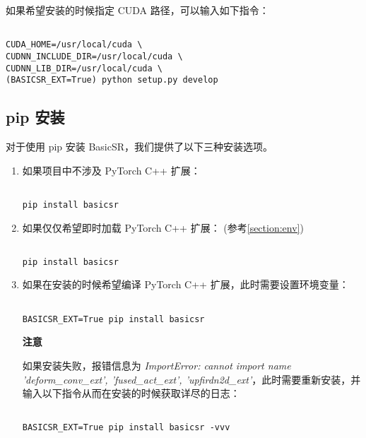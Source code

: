 \documentclass[../main.tex]{subfiles}
\begin{document}
\label{section:clone}



如果希望安装的时候指定 CUDA 路径，可以输入如下指令：

\begin{verbatim}

CUDA_HOME=/usr/local/cuda \
CUDNN_INCLUDE_DIR=/usr/local/cuda \
CUDNN_LIB_DIR=/usr/local/cuda \
(BASICSR_EXT=True) python setup.py develop

\end{verbatim}

\subsection{pip 安装}
对于使用 pip 安装 BasicSR，我们提供了以下三种安装选项。

\begin{enumerate}
    \item 如果项目中不涉及 PyTorch C++ 扩展：
    \begin{verbatim}

pip install basicsr

    \end{verbatim}

    \item 如果仅仅希望即时加载 PyTorch C++ 扩展： (参考\ref{section:env})
    \begin{verbatim}

pip install basicsr

    \end{verbatim}

    \item 如果在安装的时候希望编译 PyTorch C++ 扩展，此时需要设置环境变量：

    \begin{verbatim}

BASICSR_EXT=True pip install basicsr

    \end{verbatim}

    \begin{note} %
    	\textbf{注意}

    	如果安装失败，报错信息为 \textit{ImportError: cannot import name 'deform\_conv\_ext', 'fused\_act\_ext', 'upfirdn2d\_ext'}，此时需要重新安装，并输入以下指令从而在安装的时候获取详尽的日志：

    	\begin{verbatim}

BASICSR_EXT=True pip install basicsr -vvv

        \end{verbatim}

    \end{note}

\end{enumerate}
\end{document}
